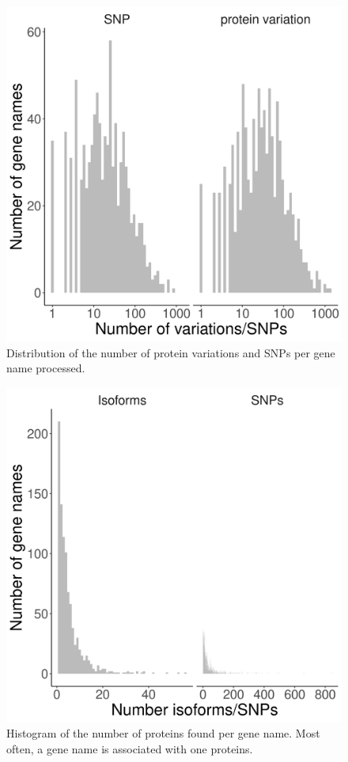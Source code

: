 \begin{figure}[!htbp]
  \includegraphics[width=\textwidth]{ncbi_peregrine_results/fig_snps_per_gene_name_processed.png}
  \caption{
    Distribution of the number of protein variations and SNPs per gene name processed.
  }
  \label{fig:snps_per_gene_name_processed}
\end{figure}

\begin{figure}[!htbp]
  \includegraphics[width=\textwidth]{ncbi_peregrine_results/fig_n_proteins_per_gene_name.png}
  \caption{
    Histogram of the number of proteins found per gene name.
    Most often, a gene name is associated with one proteins. 
  }
  \label{fig:n_proteins_per_gene_name}
\end{figure}


